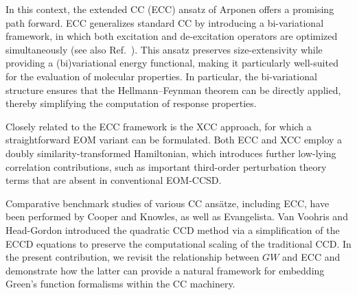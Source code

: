 \documentclass[aip,jcp,reprint,noshowkeys,superscriptaddress]{revtex4-2}
\begin{document}
In this context, the extended CC (ECC) ansatz of Arponen offers a promising path forward. \cite{Arponen_1983} 
ECC generalizes standard CC by introducing a bi-variational framework, \cite{Arponen_1982,Arponen_1983,Arponen_1987a,Arponen_1987b} in which both excitation and de-excitation operators are optimized simultaneously (see also Ref.~).
This ansatz preserves size-extensivity while providing a (bi)variational energy functional, making it particularly well-suited for the evaluation of molecular properties. 
In particular, the bi-variational structure ensures that the Hellmann--Feynman theorem can be directly applied, thereby simplifying the computation of response properties. \cite{Pal_1986,Pal_1990,Ghose_1993,Basu-Kumar_1998,Manohar_2004}

Closely related to the ECC framework is the XCC approach, \cite{Bartlett_1988,Bartlett_1989} for which a straightforward EOM variant can be formulated. \cite{Piecuch_1999} Both ECC and XCC employ a doubly similarity-transformed Hamiltonian, which introduces further low-lying correlation contributions, such as important third-order perturbation theory terms that are absent in conventional EOM-CCSD.\cite{Piecuch_1999,Lange_2018}

Comparative benchmark studies of various CC ansätze, including ECC, have been performed by Cooper and Knowles, \cite{Cooper_2010} as well as Evangelista. \cite{Evangelista_2011}
Van Voohris and Head-Gordon introduced the quadratic CCD method via a simplification of the ECCD equations to preserve the computational scaling of the traditional CCD. \cite{vanVoorhis_2000}
In the present contribution, we revisit the relationship between $GW$ and ECC and demonstrate how the latter can provide a natural framework for embedding Green's function formalisms within the CC machinery.
\end{document}
